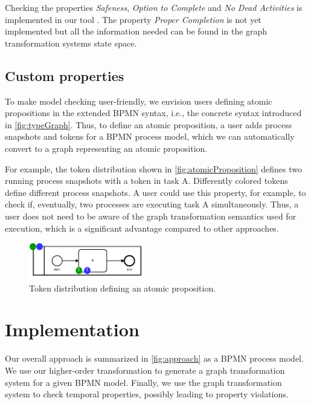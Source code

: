 \documentclass[runningheads]{llncs}
\begin{document}
Checking the properties \textit{Safeness}, \textit{Option to Complete} and \textit{No Dead Activities} is implemented in our tool \cite{krauterArtifactsICGT2023}.
The property \textit{Proper Completion} is not yet implemented but all the information needed can be found in the graph transformation systems state space.

\subsection{Custom properties} \label{subsec:customProperties}
To make model checking user-friendly, we envision users defining atomic propositions in the extended BPMN syntax, i.e., the concrete syntax introduced in \autoref{fig:typeGraph}.
Thus, to define an atomic proposition, a user adds process snapshots and tokens for a BPMN process model, which we can automatically convert to a graph representing an atomic proposition.

For example, the token distribution shown in \autoref{fig:atomicProposition} defines two running process snapshots with a token in task A.
Differently colored tokens define different process snapshots.
A user could use this property, for example, to check if, eventually, two processes are executing task A simultaneously.
Thus, a user does not need to be aware of the graph transformation semantics used for execution, which is a significant advantage compared to other approaches.

\begin{figure}[ht]
    \centering
    \includegraphics[width=0.45\textwidth]{images/bpmn_semantics-atomic-proposition.pdf}
    \caption{Token distribution defining an atomic proposition.}
    \label{fig:atomicProposition}
\end{figure}


\section{Implementation} \label{sec:impl}
Our overall approach is summarized in \autoref{fig:approach} as a BPMN process model.
We use our higher-order transformation to generate a graph transformation system for a given BPMN model.
Finally, we use the graph transformation system to check temporal properties, possibly leading to property violations.
\end{document}
